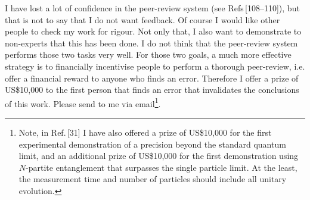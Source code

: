 \documentclass[reqno]{amsart}
\begin{document}
I have lost a lot of confidence in the peer-review system (see Refs\,[\textcolor{blue!50!black}{108}--\textcolor{blue!50!black}{110}]), but that is not to say that I do not want feedback. Of course I would like other people to check my work for rigour. Not only that, I also want to demonstrate to non-experts that this has been done. I do not think that the peer-review system performs those two tasks very well. For those two goals, a much more effective strategy is to financially incentivise people to perform a thorough peer-review, i.e. offer a financial reward to anyone who finds an error. Therefore I offer a prize of US\$10,000 to the first person that finds an error that invalidates the conclusions of this work. Please send to me via email\footnote{Note, in Ref.\,[\textcolor{blue!50!black}{31}] I have also offered a prize of US\$10,000 for the first experimental demonstration of a precision beyond the standard quantum limit, and an additional prize of US\$10,000 for the first demonstration using $N$-partite entanglement that surpasses the single particle limit. At the least, the measurement time and number of particles should include all unitary evolution.}.%

\newpage
\end{document}
